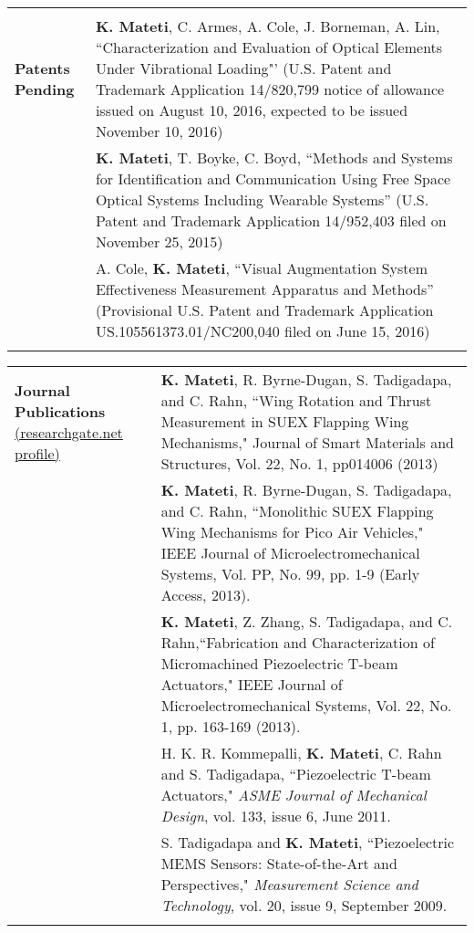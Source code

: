 \documentclass{article}[16pt]
\newlength{\lcolw}
\newlength{\rcolw}
\newlength{\hlcolw}
\begin{document}
\begin{tabular}{L{\hlcolw}  L{\rcolw}}
\hline \\
\textbf{\Large Patents Pending} 
& \textbf{K. Mateti}, C. Armes, A. Cole, J. Borneman, A. Lin, ``Characterization and Evaluation of Optical Elements Under Vibrational Loading"' (U.S. Patent and Trademark Application 14/820,799 notice of allowance issued on August 10, 2016, expected to be issued November 10, 2016)
\vspace{0.1in} \\
& \textbf{K. Mateti}, T. Boyke, C. Boyd, ``Methods and Systems for Identification and Communication Using Free Space Optical Systems Including Wearable Systems” (U.S. Patent and Trademark Application 14/952,403 filed on November 25, 2015)
\vspace{0.1in} \\
& A. Cole, \textbf{K. Mateti}, ``Visual Augmentation System Effectiveness Measurement Apparatus and Methods” (Provisional U.S. Patent and Trademark Application US.105561373.01/NC200,040 filed on June 15, 2016) 
\vspace{0.1in} \\
\hline \\ 
\end{tabular}

\begin{tabular}{L{\hlcolw}  L{\rcolw}}
\textbf{\Large Journal Publications} \href{https://www.researchgate.net/profile/Kiron_Mateti}{(researchgate.net profile)}  
& \textbf{K. Mateti}, R. Byrne-Dugan, S. Tadigadapa, and C. Rahn, ``Wing Rotation and Thrust Measurement in SUEX Flapping Wing Mechanisms," Journal of Smart Materials and Structures, Vol. 22, No. 1, pp014006 (2013)
\vspace{0.1in} \\
& \textbf{K. Mateti}, R. Byrne-Dugan, S. Tadigadapa, and C. Rahn, ``Monolithic SUEX Flapping Wing Mechanisms for Pico Air Vehicles," IEEE Journal of Microelectromechanical Systems, Vol. PP, No. 99, pp. 1-9 (Early Access, 2013). 
\vspace{0.1in} \\
& \textbf{K. Mateti}, Z. Zhang, S. Tadigadapa, and C. Rahn,``Fabrication and Characterization of Micromachined Piezoelectric T-beam Actuators," IEEE Journal of Microelectromechanical Systems, Vol. 22, No. 1, pp. 163-169 (2013). 
\vspace{0.1in} \\
& H. K. R. Kommepalli, \textbf{K. Mateti}, C. Rahn and  S. Tadigadapa, ``Piezoelectric T-beam Actuators," {\it ASME Journal of Mechanical Design}, vol. 133, issue 6, June 2011.
\vspace{0.1in} \\
& S. Tadigadapa and \textbf{K. Mateti}, ``Piezoelectric MEMS Sensors: State-of-the-Art and Perspectives," {\it Measurement Science and Technology}, vol. 20, issue 9, September 2009. \vspace{0.1in} \\
\hline \\ 
\end{tabular}
\end{document}
